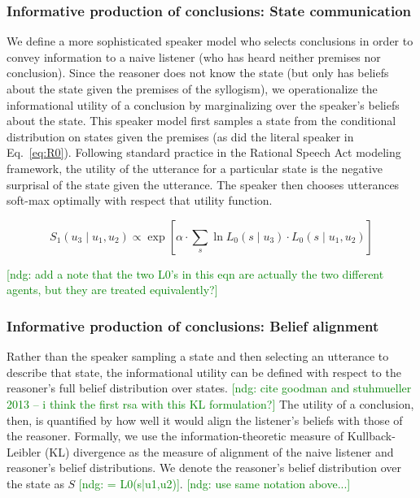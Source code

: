 \documentclass[floatsintext, doc]{apa6}
\newcommand{\mht}[1]{{\textcolor{Blue}{[mht: #1]}}}
\newcommand{\ndg}[1]{{\textcolor{Green}{[ndg: #1]}}}
\begin{document}
\subsubsection{Informative production of conclusions: State communication}

We define a more sophisticated speaker model who selects conclusions in order to convey information to a naive listener (who has heard neither premises nor conclusion). 
Since the reasoner does not know the state (but only has beliefs about the state given the premises of the syllogism), we operationalize the informational utility of a conclusion by marginalizing over the speaker's beliefs about the state.
This speaker model first samples a state from the conditional distribution on states given the premises (as did the literal speaker in Eq.~\ref{eq:R0}).
Following standard practice in the Rational Speech Act modeling framework, the utility of the utterance for a particular state is the negative surprisal of the state given the utterance.
The speaker then chooses utterances soft-max optimally with respect that utility function.

\begin{equation}
S_1(u_3 \mid u_1, u_2) \propto \exp{ [ \alpha \cdot  \sum_s  \ln L_0(s \mid u_3) \cdot L_0(s \mid u_1, u_2) ] } \label{eq:R1a}
\end{equation}

\ndg{add a note that the two L0's in this eqn are actually the two different agents, but they are treated equivalently?}


\subsubsection{Informative production of conclusions: Belief alignment}

Rather than the speaker sampling a state and then selecting an utterance to describe that state, the informational utility can be defined with respect to the reasoner's full belief distribution over states. \ndg{cite goodman and stuhmueller 2013 -- i think the first rsa with this KL formulation?} 
The utility of a conclusion, then, is quantified by how well it would align the listener's beliefs with those of the reasoner. 
Formally, we use the information-theoretic measure of Kullback-Leibler (KL) divergence as the measure of alignment of the naive listener and reasoner's belief distributions. 
We denote the reasoner's belief distribution over the state as $S$ \ndg{= L0(s|u1,u2)}. \ndg{use same notation above...}
\end{document}
